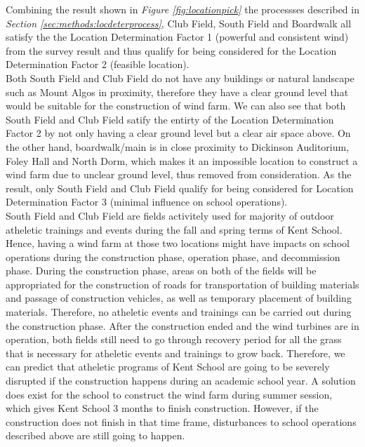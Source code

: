 \documentclass[review]{elsarticle}
\begin{document}
Combining the result shown in \textit{Figure \ref{fig:locationpick}} the processses described in \textit{Section \ref{sec:methods:locdeterprocess}}, Club Field, South Field and 
Boardwalk all satisfy the the Location Determination Factor 1 (powerful and consistent wind) from the survey result and thus qualify for being considered for the Location Determination Factor 2 (feasible location).  %
\\\indent Both South Field and Club Field do not have any buildings or natural landscape such as Mount Algos in proximity, therefore they have a clear ground level that would 
be suitable for the construction of wind farm. We can also see that both South Field and Club Field satify the entirty of the Location Determination Factor 2 by not only having 
a clear ground level but a clear air space above. On the other hand, boardwalk/main is in close proximity to Dickinson Auditorium, Foley Hall and North Dorm, which makes it an 
impossible location to construct a wind farm due to unclear ground level, thus removed from consideration. As the result, only South Field and Club Field qualify for being 
considered for Location Determination Factor 3 (minimal influence on school operations).
\\\indent South Field and Club Field are fields activitely used for majority of outdoor atheletic trainings and events during the fall and spring terms of Kent School. Hence, 
having a wind farm at those two locations might have impacts on school operations during the construction phase, operation phase, and decommission phase. During the construction 
phase, areas on both of the fields will be appropriated for the construction of roads for transportation of building materials and passage of construction vehicles, as well as
temporary placement of building materials. Therefore, no atheletic events and trainings can be carried out during the construction phase. After the construction ended and the wind 
turbines are in operation, both fields still need to go through recovery period for all the grass that is necessary for atheletic events and trainings to grow back. Therefore, we 
can predict that atheletic programs of Kent School are going to be severely disrupted if the construction happens during an academic school year. A solution does exist for the school 
to construct the wind farm during summer session, which gives Kent School 3 months to finish construction. However, if the construction does not finish in that time frame, disturbances 
to school operations described above are still going to happen. %
\end{document}
